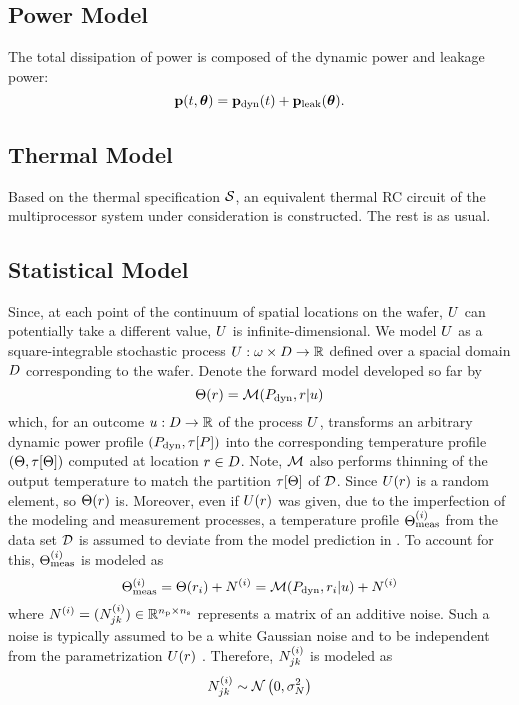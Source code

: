 \subsection{Power Model}
The total dissipation of power is composed of the dynamic power and leakage power:
\[
  \mathbf{p}(t, \boldsymbol\theta) = \mathbf{p}_{\text{dyn}}(t) + \mathbf{p}_{\text{leak}}(\boldsymbol\theta).
\]

\subsection{Thermal Model}
Based on the thermal specification $\mathcal{S}$, an equivalent thermal RC circuit of the multiprocessor system under consideration is constructed. The rest is as usual.

\subsection{Statistical Model}
Since, at each point of the continuum of spatial locations on the wafer, $U$ can potentially take a different value, $U$ is infinite-dimensional. We model $U$ as a square-integrable stochastic process $U: \omega \times D \to \mathbb{R}$ defined over a spacial domain $D$ corresponding to the wafer. Denote the forward model developed so far by
\begin{equation} \elabel{model}
  \mT(\r) = \model{\mP_\dyn, \r | \u}
\end{equation}
which, for an outcome $u: D \to \mathbb{R}$ of the process $U$, transforms an arbitrary dynamic power profile $(P_{\text{dyn}}, \tau[P])$ into the corresponding temperature profile $\profileT$ computed at location $r \in D$. Note, $\model$ also performs thinning of the output temperature to match the partition $\tau[\Theta]$ of $\mathcal{D}$. Since $U(r)$ is a random element, so $\Theta(r)$ is. Moreover, even if $U(r)$ was given, due to the imperfection of the modeling and measurement processes, a temperature profile $\Theta^{(i)}_{\text{meas}}$ from the data set $\mathcal{D}$ is assumed to deviate from the model prediction in . To account for this, $\Theta^{(i)}_{\text{meas}}$ is modeled as
\[
  \mT^{(i)}_\meas = \mT(\r_i) + \mnoise^{(i)} = \model{\mP_\dyn, \r_i | \u} + \mnoise^{(i)}
\]
where $N^{(i)} = (N^{(i)}_{jk}) \in \mathbb{R}^{{n_\text{p}} \times {n_\text{s}}}$ represents a matrix of an additive noise. Such a noise is typically assumed to be a white Gaussian noise and to be independent from the parametrization $U(r)$ \cite{marzouk2007, el-moselhy2012}. Therefore, $N^{(i)}_{jk}$ is modeled as
\[
  N^{(i)}_{jk} \sim \mathcal{N}\left(0, \sigma^2_N\right)
\]
